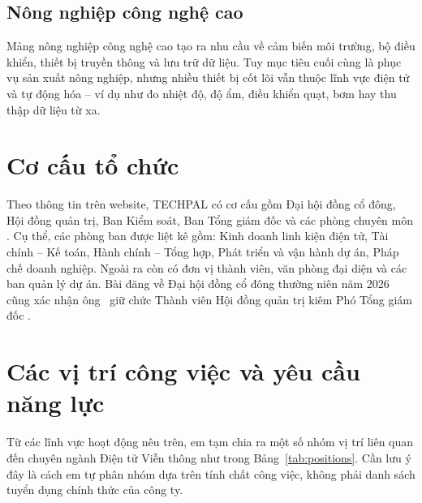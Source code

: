 \subsection{Nông nghiệp công nghệ cao}

Mảng nông nghiệp công nghệ cao tạo ra nhu cầu về cảm biến môi trường, bộ điều
khiển, thiết bị truyền thông và lưu trữ dữ liệu. Tuy mục tiêu cuối cùng là phục
vụ sản xuất nông nghiệp, nhưng nhiều thiết bị cốt lõi vẫn thuộc lĩnh vực điện
tử và tự động hóa -- ví dụ như đo nhiệt độ, độ ẩm, điều khiển quạt, bơm hay thu
thập dữ liệu từ xa.

\section{Cơ cấu tổ chức}

Theo thông tin trên website, TECHPAL có cơ cấu gồm Đại hội đồng cổ đông, Hội
đồng quản trị, Ban Kiểm soát, Ban Tổng giám đốc và các phòng chuyên môn
\cite{techpal-intro}. Cụ thể,
các phòng ban được liệt kê gồm: Kinh doanh linh kiện điện tử, Tài chính -- Kế
toán, Hành chính -- Tổng hợp, Phát triển và vận hành dự án, Pháp chế doanh
nghiệp. Ngoài ra còn có đơn vị thành viên, văn phòng đại diện và các ban quản lý
dự án. Bài đăng về Đại hội đồng cổ đông thường niên năm
2026 cũng xác nhận ông \CompanyRepresentative\ giữ chức Thành viên Hội đồng quản
trị kiêm Phó Tổng giám đốc \cite{techpal-agm2026}.

\section{Các vị trí công việc và yêu cầu năng lực}

Từ các lĩnh vực hoạt động nêu trên, em tạm chia ra một số nhóm vị trí liên quan
đến chuyên ngành Điện tử Viễn thông như trong Bảng~\ref{tab:positions}. Cần lưu ý
đây là cách em tự phân nhóm dựa trên tính chất công việc, không phải danh sách
tuyển dụng chính thức của công ty.

